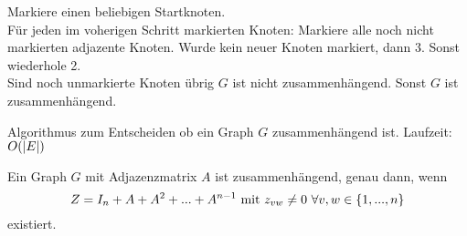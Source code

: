 	\begin{algorithm}[H]
		\vspace*{5pt}
		Markiere einen beliebigen Startknoten.\\
		Für jeden im voherigen Schritt markierten Knoten: Markiere alle noch nicht markierten adjazente Knoten. Wurde kein neuer Knoten markiert, dann 3. Sonst wiederhole 2.\\
		Sind noch unmarkierte Knoten übrig \Return \dq $G$ ist nicht zusammenhängend\dq. Sonst \dq$G$ ist zusammenhängend\dq.
		\caption{Algorithmus zum Entscheiden ob ein Graph $G$ zusammenhängend ist. Laufzeit: $O(\vert E \vert)$}
	\end{algorithm}
	\begin{satz}
		Ein Graph $G$ mit Adjazenzmatrix $A$ ist zusammenhängend, genau dann, wenn
		\begin{equation*}
			Z = I_n + A + A^2 + ... + A^{n-1} \text{ mit } z_{vw} \neq 0~ \forall v, w \in \{1, ..., n\}
		\end{equation*}
		existiert.
	\end{satz}

